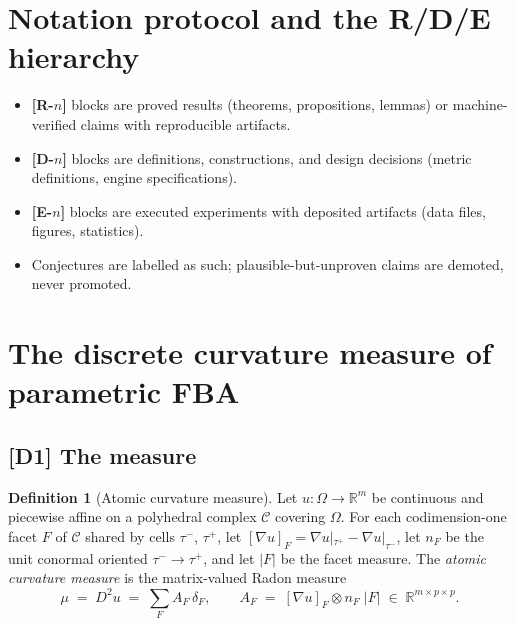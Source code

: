 \documentclass[11pt,a4paper]{article}
\theoremstyle{plain}
\theoremstyle{definition}
\newtheorem{definition}[theorem]{Definition}
\theoremstyle{remark}
\newcommand{\CC}{\mathcal{C}}
\newcommand{\RR}{\mathbb{R}}
\begin{document}
\section{Notation protocol and the R/D/E hierarchy}\label{sec:notation}

\begin{itemize}
\item \textbf{[R-$n$]} blocks are proved results (theorems, propositions,
      lemmas) or machine-verified claims with reproducible artifacts.
\item \textbf{[D-$n$]} blocks are definitions, constructions, and design
      decisions (metric definitions, engine specifications).
\item \textbf{[E-$n$]} blocks are executed experiments with deposited
      artifacts (data files, figures, statistics).
\item Conjectures are labelled as such; plausible-but-unproven claims are
      demoted, never promoted.
\end{itemize}

\section{The discrete curvature measure of parametric FBA}
\label{sec:measure}


\subsection{[D1] The measure}

\begin{definition}[Atomic curvature measure]\label{def:mu}
Let $u : \Omega \to \RR^m$ be continuous and piecewise affine on a
polyhedral complex $\CC$ covering $\Omega$. For each codimension-one facet
$F$ of $\CC$ shared by cells $\tau^-$, $\tau^+$, let
$[\nabla u]_F = \nabla u|_{\tau^+} - \nabla u|_{\tau^-}$, let $n_F$ be the
unit conormal oriented $\tau^- \to \tau^+$, and let $|F|$ be the facet
measure. The \emph{atomic curvature measure} is the matrix-valued Radon
measure
\[
\mu \;=\; D^2 u \;=\; \sum_{F} A_F \, \delta_F,
\qquad
A_F \;=\; [\nabla u]_F \otimes n_F \; |F| \;\in\; \RR^{m \times p \times p}.
\]
\end{definition}
\end{document}

